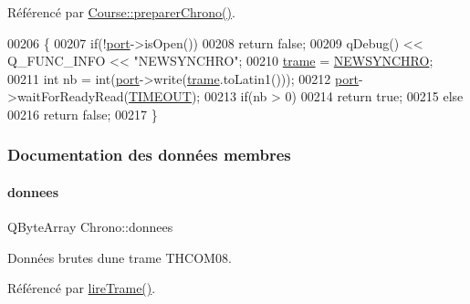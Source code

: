 Référencé par \hyperlink{class_course_a50596f54553b48fa29170a6b42b6e9d4}{Course\+::preparer\+Chrono()}.


\begin{DoxyCode}
00206 \{
00207     \textcolor{keywordflow}{if}(!\hyperlink{class_chrono_aca5fbe0eebd7f876f954d4a99c564167}{port}->isOpen())
00208         \textcolor{keywordflow}{return} \textcolor{keyword}{false};
00209     qDebug() << Q\_FUNC\_INFO << \textcolor{stringliteral}{"NEWSYNCHRO"};
00210     \hyperlink{class_chrono_a26f2155aa6e5ef4296e5456b64a713b5}{trame} = \hyperlink{chrono_8h_a6fd2c46c463ee5bf46edf6f117c277ec}{NEWSYNCHRO};
00211     \textcolor{keywordtype}{int} nb = int(\hyperlink{class_chrono_aca5fbe0eebd7f876f954d4a99c564167}{port}->write(\hyperlink{class_chrono_a26f2155aa6e5ef4296e5456b64a713b5}{trame}.toLatin1()));
00212     \hyperlink{class_chrono_aca5fbe0eebd7f876f954d4a99c564167}{port}->waitForReadyRead(\hyperlink{chrono_8h_a45ba202b05caf39795aeca91b0ae547e}{TIMEOUT});
00213     \textcolor{keywordflow}{if}(nb > 0)
00214         \textcolor{keywordflow}{return} \textcolor{keyword}{true};
00215     \textcolor{keywordflow}{else}
00216         \textcolor{keywordflow}{return} \textcolor{keyword}{false};
00217 \}
\end{DoxyCode}


\subsubsection{Documentation des données membres}
\mbox{\label{class_chrono_a7771ee85460ad5f61f96cea2267ae23f}} 
\paragraph{\texorpdfstring{donnees}{donnees}}
{\footnotesize\ttfamily Q\+Byte\+Array Chrono\+::donnees\hspace{0.3cm}{\ttfamily [private]}}



Données brutes d\textquotesingle{}une trame T\+H\+C\+O\+M08. 



Référencé par \hyperlink{class_chrono_ae7c3c8494ace02f4c9dd714f6f0e574a}{lire\+Trame()}.

\mbox{\label{class_chrono_ad82d4f2a230290aa9695f12bf5ac02e8}} 

